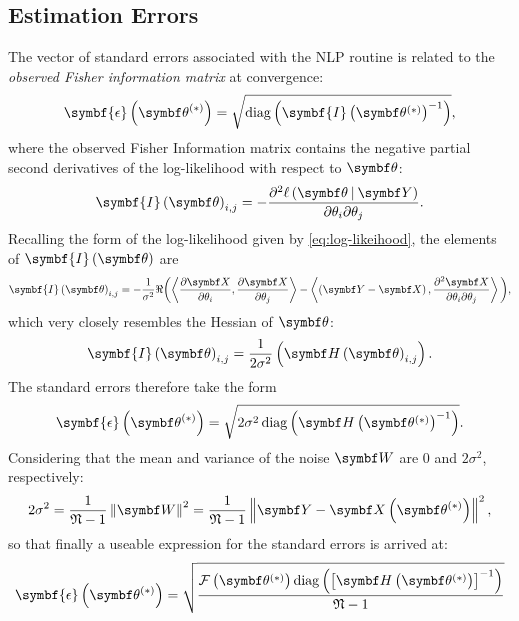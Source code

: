 \subsection{Estimation Errors}
\label{subsec:errors}
The vector of standard errors associated with the \ac{NLP} routine is related
to the \emph{observed Fisher information matrix} at convergence\cite[Section
2.7]{Pawitan2001}:
\begin{equation}
    \symbf{\epsilon}\left(\bthstar\right) = \sqrt{\diag\left(\symbf{I}\left( \bthstar \right)^{-1}\right)},
\end{equation}
where the observed Fisher Information matrix contains the negative partial second
derivatives of the log-likelihood with respect to $\bth$:
\begin{equation}
    \symbf{I}\left(\bth\right)_{i, j} =
        -\frac
        {\partial^2 \ell \left( \bdthY \right)}
        {\partial \theta_i \partial \theta_j}.
\end{equation}
Recalling the form of the log-likelihood given by \eqref{eq:log-likeihood},
the elements of $\symbf{I}\left(\bth\right)$ are
\begin{equation}
    \symbf{I}\left(\bth\right)_{i, j} =
        -\frac{1}{\sigma^2}
        \Re
        \biggl(
            \left\langle
                \frac{\partial \bX}{\partial \theta_i},
                \frac{\partial \bX}{\partial \theta_j}
            \right\rangle
            -
            \left\langle
                \left(\bY - \bX\right),
                \frac{\partial^2 \bX}{\partial \theta_i \partial \theta_j}
            \right\rangle
        \biggl),
\end{equation}
which very closely resembles the Hessian of $\bth$:
\begin{equation}
    \symbf{I}\left(\bth\right)_{i,j} =
        \frac{1}{2 \sigma^2} \left(
            \bdHth_{i,j}
        \right).
\end{equation}
The standard errors therefore take the form
\begin{equation}
    \symbf{\epsilon}\left(\bthstar\right) =
        \sqrt{
            2\sigma^2 \diag \left(
                \bdHthstar^{-1}
            \right)
        }.
\end{equation}
Considering that the mean and variance of the noise $\bW$ are $0$ and $2\sigma^2$, respectively:
\begin{equation}
    2 \sigma^2 = \frac{1}{\mathfrak{N} - 1}
    \left\lVert \bW \right\rVert^2 =
    \frac{1}{\mathfrak{N} - 1} \left \lVert
        \bY - \bXthstar
    \right \rVert^2,
\end{equation}
so that finally a useable expression for the standard errors is arrived at:
\begin{equation}
    \symbf{\epsilon}\left(\bthstar\right) =
        \sqrt{
            \frac
            {
                \Fthstar \diag \left(
                    \left[\bdHthstar\right]^{-1}
                \right)
            }
            {\mathfrak{N} - 1}
        }
\end{equation}

